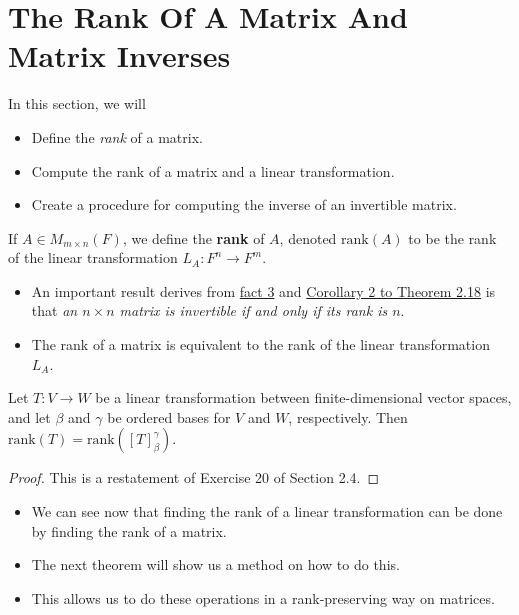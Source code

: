 \section{The Rank Of A Matrix And Matrix Inverses}

In this section, we will
\begin{itemize}
    \item Define the \textit{rank} of a matrix. 
    \item Compute the rank of a matrix and a linear transformation.
    \item Create a procedure for computing the inverse of an invertible matrix.
\end{itemize}

\begin{definition}[Rank]
    If \( A \in {M}_{m \times n}(F)  \), we define the \textbf{rank} of \( A  \), denoted \( \text{rank}(A) \) to be the rank of the linear transformation \( {L}_{A}: F^{n} \to F^{m} \).
\end{definition}

\begin{itemize}
    \item An important result derives from {\hyperref[Fact 3]{fact 3}} and {\hyperref[Corollary 2 to Theorem 2.18]{Corollary 2 to Theorem 2.18}} is that \textit{an \( n \times n  \) matrix is invertible if and only if its rank is \( n \)}.
    \item The rank of a matrix is equivalent to the rank of the linear transformation \( {L}_{A} \).
\end{itemize}

\begin{theorem}
    Let \( T: V \to W  \) be a linear transformation between finite-dimensional vector spaces, and let \( \beta  \) and \( \gamma \) be ordered bases for \( V  \) and \( W  \), respectively. Then \( \text{rank}(T) = \text{rank}([T]_{\beta}^{\gamma} ) \).
\end{theorem}
\begin{proof}
This is a restatement of Exercise 20 of Section 2.4.
\end{proof}

\begin{itemize}
    \item We can see now that finding the rank of a linear transformation can be done by finding the rank of a matrix.
    \item The next theorem will show us a method on how to do this. 
    \item This allows us to do these operations in a rank-preserving way on matrices.
\end{itemize}

